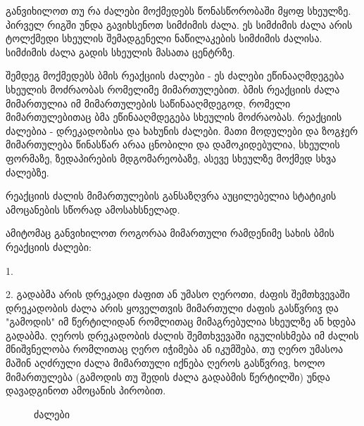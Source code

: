 \documentclass[a4paper]{book}
\begin{document}
განვიხილოთ თუ რა ძალები მოქმედებს წონასწორობაში მყოფ სხეულზე. პირველ რიგში უნდა გავიხსენოთ სიმძიმის ძალა. ეს სიმძიმის ძალა არის ტოლქმედი სხეულის შემადგენელი ნაწილაკების სიმძიმის ძალისა. სიმძიმის ძალა გადის სხეულის მასათა ცენტრზე. 
	
შემდეგ მოქმედებს ბმის რეაქციის ძალები - ეს ძალები ეწინააღმდეგება სხეულის მოძრაობას რომელიმე მიმართულებით. ბმის რეაქციის ძალა მიმართულია იმ მიმართულების საწინააღმდეგოდ, რომელი მიმართულებითაც ბმა ეწინააღმდეგება სხეულის მოძრაობას. რეაქციის ძალებია - დრეკადობისა და ხახუნის ძალები. მათი მოდულები და ზოგჯერ მიმართულება წინასწარ არაა ცნობილი და დამოკიდებულია, სხეულის ფორმაზე, ზედაპირების მდგომარეობაზე, ასევე სხეულზე მოქმედ სხვა ძალებზე.
	
რეაქციის ძალის მიმართულების განსაზღვრა აუცილებელია სტატიკის ამოცანების სწორად ამოსახსნელად.	

ამიტომაც განვიხილოთ როგორაა მიმართული რამდენიმე სახის ბმის რეაქციის ძალები:
	
1. 
	
2. გადაბმა არის დრეკადი ძაფით ან უმასო ღეროთი, ძაფის შემთხვევაში დრეკადობის ძალა არის ყოველთვის მიმართული ძაფის გასწვრივ და "გამოდის" იმ წერტილიდან რომლითაც მიმაგრებულია სხეულზე ან ხდება გადაბმა. ღეროს დრეკადობის ძალის შემთხვევაში იგულისხმება იმ ძალის მნიშვნელობა რომლითაც ღერო იჭიმება ან იკუმშება, თუ ღერო უმასოა მაშინ აღძრული ძალა მიმართული იქნება ღეროს გასწვრივ, ხოლო მიმართულება (გამოდის თუ შედის ძალა გადაბმის წერტილში) უნდა დავადგინოთ ამოცანის პირობით.
		\begin{figure}[H]%
   			 \centering
    		\qquad
   	 		\caption{ძალები}%
    	\label{fig:example}%
		\end{figure}	 
	 
\end{document}
